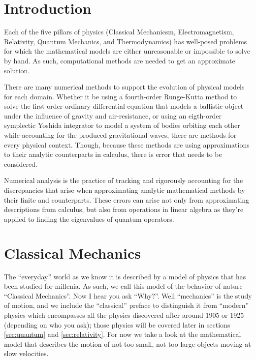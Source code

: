 \documentclass{report}
\begin{document}
\chapter{Introduction}

    Each of the five pillars of physics (Classical Mechanicsm, Electromagnetism, Relativity, Quantum Mechanics, and Thermodynamics) has well-posed problems for which the mathematical models are either unreasonable or impossible to solve by hand.  As such, computational methods are needed to get an approximate solution.  
    
    There are many numerical methods to support the evolution of physical models for each domain.  Whether it be using a fourth-order Runge-Kutta method to solve the first-order ordinary differential equation that models a ballistic object under the influence of gravity and air-resistance, or using an eigth-order symplectic Yoshida integrator to model a system of bodies orbiting each other while accounting for the produced gravitational waves, there are methods for every physical context.  Though, because these methods are using approximations to their analytic counterparts in calculus, there is error that needs to be considered.

    Numerical analysis is the practice of tracking and rigorously accounting for the discrepancies that arise when approximating analytic mathematical methods by their finite and counterparts.  These errors can arise not only from approximating descriptions from calculus, but also from operations in linear algebra as they're applied to finding the eigenvalues of quantum operators.

\chapter{Classical Mechanics} \label{sec:classical}

    The ``everyday'' world as we know it is described by a model of physics that has been studied for millenia.  As such, we call this model of the behavior of nature ``Classical Mechanics''.  Now I hear you ask ``Why?''.  Well ``mechanics'' is the study of motion, and we include the ``classical'' preface to distinguish it from ``modern'' physics which encompasses all the physics discovered after around 1905 or 1925 (depending on who you ask); those physics will be covered later in sections \ref{sec:quantum} and \ref{sec:relativity}.  For now we take a look at the mathematical model that describes the motion of not-too-small, not-too-large objects moving at slow velocities.
    
\end{document}
